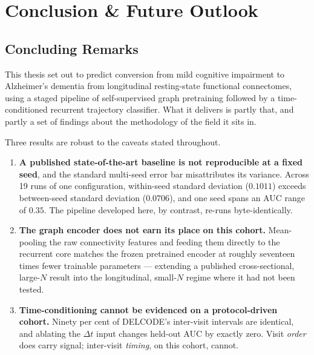 \chapter{Conclusion \& Future Outlook}
\label{ch:conclusion}

\section{Concluding Remarks}
\label{sec:conclusion}


This thesis set out to predict conversion from mild cognitive impairment to Alzheimer's
dementia from longitudinal resting-state functional connectomes, using a staged pipeline of
self-supervised graph pretraining followed by a time-conditioned recurrent trajectory
classifier. What it delivers is partly that, and partly a set of findings about the
methodology of the field it sits in.

Three results are robust to the caveats stated throughout.

\begin{enumerate}
  \item \textbf{A published state-of-the-art baseline is not reproducible at a fixed seed},
    and the standard multi-seed error bar misattributes its variance. Across 19 runs of one
    configuration, within-seed standard deviation ($0.1011$) exceeds between-seed standard
    deviation ($0.0706$), and one seed spans an AUC range of $0.35$. The pipeline developed
    here, by contrast, re-runs byte-identically.
  \item \textbf{The graph encoder does not earn its place on this cohort.} Mean-pooling the
    raw connectivity features and feeding them directly to the recurrent core matches the
    frozen pretrained encoder at roughly seventeen times fewer trainable parameters ---
    extending a published cross-sectional, large-$N$ result into the longitudinal, small-$N$
    regime where it had not been tested.
  \item \textbf{Time-conditioning cannot be evidenced on a protocol-driven cohort.} Ninety
    per cent of DELCODE's inter-visit intervals are identical, and ablating the $\Delta t$
    input changes held-out AUC by exactly zero. Visit \emph{order} does carry signal;
    inter-visit \emph{timing}, on this cohort, cannot.
\end{enumerate}

